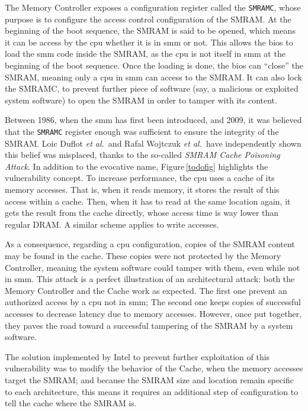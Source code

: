 The Memory Controller exposes a configuration register called the
\texttt{SMRAMC}, whose purpose is to configure the access control configuration
of the SMRAM.
%
At the beginning of the boot sequence, the SMRAM is said to be opened, which
means it can be access by the \ac{cpu} whether it is in \ac{smm} or not.
%
This allows the \ac{bios} to load the \ac{smm} code inside the SMRAM, as the \ac{cpu}
is not itself in \ac{smm} at the beginning of the boot sequence.
%
Once the loading is done, the \ac{bios} can ``close'' the SMRAM, meaning only a
\ac{cpu} in \ac{smm} can access to the SMRAM.
%
It can also lock the SMRAMC, to prevent further piece of software (say, a
malicious or exploited system software) to open the SMRAM in order to tamper
with its content.

Between 1986, when the \ac{smm} has first been
introduced, and 2009, it was believed that the \texttt{SMRAMC} register enough
was sufficient to ensure the integrity of the SMRAM.
%
Loic Duflot \emph{et al.}\,\cite{duflot2009smram} and Rafal Wojtczuk \emph{et
  al.}\,\cite{wojtczuk2009smram} have independently shown this belief was
misplaced, thanks to the so-called \emph{SMRAM Cache Poisoning Attack}.
%
In addition to the evocative name, Figure\,\ref{todofig} highlights the
vulnerability concept.
%
To increase performance, the \ac{cpu} uses a cache of its memory accesses.
%
That is, when it reads memory, it stores the result of this access within a
cache.
%
Then, when it has to read at the same location again, it gets the result from
the cache directly, whose access time is way lower than regular DRAM.
%
A similar scheme applies to write accesses.

As a consequence, regarding a \ac{cpu} configuration, copies of the SMRAM
content may be found in the cache.
%
These copies were not protected by the Memory Controller, meaning the system
software could tamper with them, even while not in \ac{smm}.
%
This attack is a perfect illustration of an architectural attack:
%
both the Memory Controller and the Cache work as expected.
%
The first one prevent an authorized access by a \ac{cpu} not in \ac{smm};
%
The second one keeps copies of successful accesses to decrease latency due to
memory accesses.
%
However, once put together, they paves the road toward a successful tampering of
the SMRAM by a system software.

The solution implemented by Intel to prevent further exploitation of this
vulnerability was to modify the behavior of the Cache, when the memory accesses
target the SMRAM;
%
and because the SMRAM size and location remain specific to each architecture,
this means it requires an additional step of configuration to tell the cache
where the SMRAM is.

